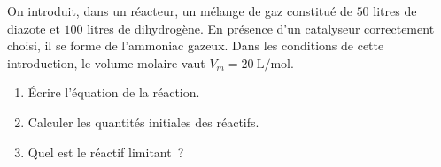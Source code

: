 On introduit, dans un réacteur, un mélange de gaz constitué de $50$ litres de
diazote et $100$ litres de dihydrogène. En présence d'un catalyseur correctement
choisi, il se forme de l'ammoniac  gazeux. Dans les conditions de cette
introduction, le volume molaire vaut $V_{m}=\qty{20}{\L\per\mol}$.
\begin{enumerate}
    \item Écrire l'équation de la réaction.
    \item Calculer les quantités initiales des réactifs.
    \item Quel est le réactif limitant~?
\end{enumerate}

